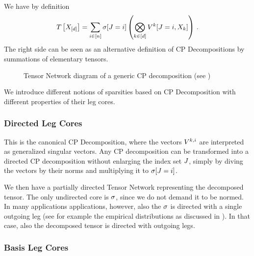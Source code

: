 We have by definition
	\[ T\left[X_{[d]}\right] = \sum_{i\in[n]} \sigma[J=i] \left( \bigotimes_{k\in[d]} V^{k}[J=i,X_{k}] \right) \, . \]
The right side can be seen as an alternative definition of CP Decompositions by summations of elementary tensors.


\begin{figure}[h]
	\begin{center}
		
	\end{center}
	\caption{Tensor Network diagram of a generic CP decomposition (see )}
\end{figure}

We introduce different notions of sparsities based on CP Decomposition with different properties of their leg cores.

\subsubsection{Directed Leg Cores}

This is the canonical CP Decomposition, where the vectors $V^{k,i}$ are interpreted as generalized singular vectors.
Any CP decomposition can be transformed into a directed CP decomposition without enlarging the index set $J$, simply by diving the vectors by their norms and multiplying it to $\sigma[J=i]$.

We then have a partially directed Tensor Network representing the decomposed tensor.
The only undirected core is $\sigma$, since we do not demand it to be normed.
In many applications applications, however, also the $\sigma$ is directed with a single outgoing leg (see for example the empirical distributions as discussed in ).
In that case, also the decomposed tensor is directed with outgoing legs.



\subsubsection{Basis Leg Cores}\label{sec:basisCP}




